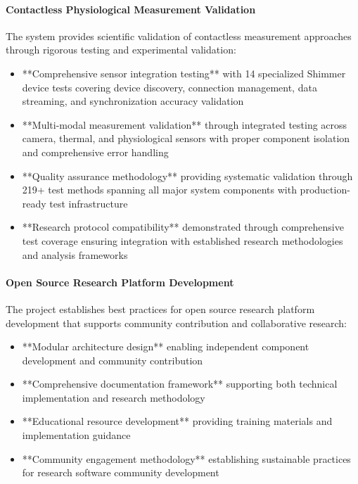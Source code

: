 \documentclass[11pt,a4paper]{article}
\begin{document}
\paragraph{Contactless Physiological Measurement Validation}

The system provides scientific validation of contactless measurement approaches through rigorous testing and
experimental validation:

\begin{itemize}
\item **Comprehensive sensor integration testing** with 14 specialized Shimmer device tests covering device discovery,
  connection management, data streaming, and synchronization accuracy validation
\item **Multi-modal measurement validation** through integrated testing across camera, thermal, and physiological
  sensors with proper component isolation and comprehensive error handling
\item **Quality assurance methodology** providing systematic validation through 219+ test methods spanning all major
  system components with production-ready test infrastructure
\item **Research protocol compatibility** demonstrated through comprehensive test coverage ensuring integration with
  established research methodologies and analysis frameworks

\end{itemize}
\paragraph{Open Source Research Platform Development}

The project establishes best practices for open source research platform development that supports community
contribution and collaborative research:

\begin{itemize}
\item **Modular architecture design** enabling independent component development and community contribution
\item **Comprehensive documentation framework** supporting both technical implementation and research methodology
\item **Educational resource development** providing training materials and implementation guidance
\item **Community engagement methodology** establishing sustainable practices for research software community development

\end{itemize}
\end{document}
